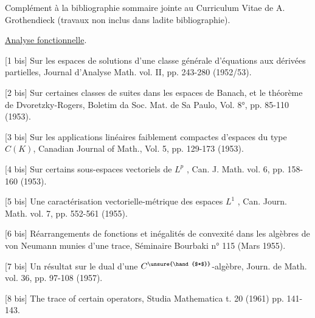 
Complément à la bibliographie sommaire jointe au
Curriculum Vitae de A. Grothendieck (travaux non inclus
dans ladite bibliographie).

\uline{Analyse fonctionnelle}.

[1 bis] Sur les espaces de solutions d'une classe
générale d'équations aux dérivées partielles,
Journal d'Analyse Math. vol. II, pp. 243-280
(1952/53).

[2 bis] Sur certaines classes de suites dans les espaces
de Banach, et le théorème de Dvoretzky-Rogers,
Boletim da Soc. Mat. de Sa Paulo, Vol. 8°,
pp. 85-110 (1953).

[3 bis] Sur les applications linéaires faiblement
compactes d'espaces du type $C(K)$, Canadian
Journal of Math., Vol. 5, pp. 129-173 (1953).

[4 bis] Sur certains sous-espaces vectoriels de $L^p$ ,
Can. J. Math. vol. 6, pp. 158-160 (1953).

[5 bis] Une caractérisation vectorielle-métrique des
espaces $L^1$ , Can. Journ. Math. vol. 7,
pp. 552-561 (1955).

[6 bis] Réarrangements de fonctions et inégalités de
convexité dans les algèbres de von Neumann
munies d'une trace, Séminaire Bourbaki n° 115
(Mars 1955).

[7 bis] Un résultat sur le dual d'une $C^{\unsure{\hand{$*$}}}$-algèbre,
Journ. de Math. vol. 36, pp. 97-108 (1957).

[8 bis] The trace of certain operators, Studia
Mathematica t. 20 (1961) pp. 141-143.

